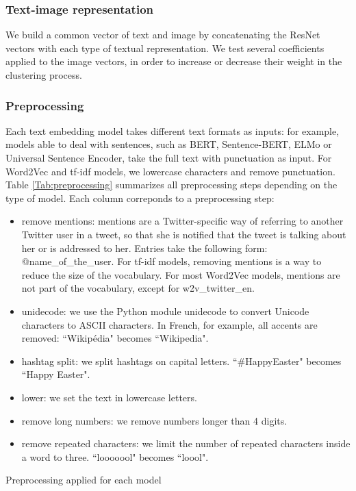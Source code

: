 \subsubsection{Text-image representation}

We build a common vector of text and image by concatenating the ResNet vectors with each type of textual representation. We test several coefficients applied to the image vectors, in order to increase or decrease their weight in the clustering process.

\subsubsection{Preprocessing}

Each text embedding model takes different text formats as inputs: for example, models able to deal with sentences, such as BERT, Sentence-BERT, ELMo or Universal Sentence Encoder, take the full text with punctuation as input. For Word2Vec and tf-idf models, we lowercase characters and remove punctuation. Table \ref{Tab:preprocessing} summarizes all preprocessing steps depending on the type of model. Each column correponds to a preprocessing step:
\begin{itemize}
    \item remove mentions: mentions are a Twitter-specific way of referring to another Twitter user in a tweet, so that she is notified that the tweet is talking about her or is addressed to her. Entries take the following form: @name\_of\_the\_user. For tf-idf models, removing mentions is a way to reduce the size of the vocabulary. For most Word2Vec models, mentions are not part of the vocabulary, except for w2v\_twitter\_en.
    \item unidecode: we use the Python module unidecode to convert Unicode characters to ASCII characters. In French, for example, all accents are removed: ``Wikipédia" becomes ``Wikipedia".
    \item hashtag split: we split hashtags on capital letters. ``\#HappyEaster" becomes ``Happy Easter".
    \item lower: we set the text in lowercase letters.
    \item remove long numbers: we remove numbers longer than 4 digits.
    \item remove repeated characters: we limit the number of repeated characters inside a word to three. ``looooool" becomes ``loool".
\end{itemize}

\begin{table}
\begin{center}
\end{center}
\caption{Preprocessing applied for each model \label{Tab:preprocessing}}
\end{table}

